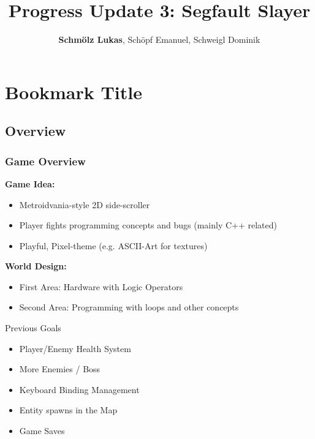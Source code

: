 \documentclass[11pt,t,usepdftitle=false,aspectratio=169]{beamer}
\title[Segfault Slayer]{Progress Update 3: Segfault Slayer}
\author[Schmölz Lukas, Schöpf Emanuel, Schweigl Dominik]{\textbf{Schmölz Lukas}, Schöpf Emanuel, Schweigl Dominik}
\begin{document}
\section{Bookmark Title}
\subsection{Overview}


\begin{frame}
    \frametitle{Game Overview}

    \textbf{Game Idea:}
    \begin{itemize}
        \item Metroidvania-style 2D side-scroller
        \item Player fights programming concepts and bugs (mainly C++ related)
        \item Playful, Pixel-theme (e.g. ASCII-Art for textures)
    \end{itemize}

    \bigskip

    \textbf{World Design:}
    \begin{itemize}
        \item First Area: Hardware with Logic Operators
        \item Second Area: Programming with loops and other concepts
    \end{itemize}
\end{frame}


\begin{frame}{Previous Goals}
    \vspace{1em}
    \begin{itemize}
        \item Player/Enemy Health System
        \item More Enemies / Boss
        \item Keyboard Binding Management
        \item Entity spawns in the Map
        \item Game Saves
    \end{itemize}
\end{frame}
\end{document}
